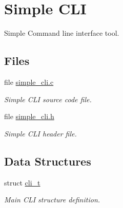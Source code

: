 \hypertarget{group___s_i_m_p_l_e___c_l_i}{\section{Simple C\+L\+I}
\label{group___s_i_m_p_l_e___c_l_i}
}


Simple Command line interface tool.  


\subsection*{Files}
\begin{DoxyCompactItemize}
\item 
file \hyperlink{simple__cli_8c}{simple\+\_\+cli.\+c}
\begin{DoxyCompactList}\small\item\em Simple C\+L\+I source code file. \end{DoxyCompactList}\item 
file \hyperlink{simple__cli_8h}{simple\+\_\+cli.\+h}
\begin{DoxyCompactList}\small\item\em Simple C\+L\+I header file. \end{DoxyCompactList}\end{DoxyCompactItemize}
\subsection*{Data Structures}
\begin{DoxyCompactItemize}
\item 
struct \hyperlink{structcli__t}{cli\+\_\+t}
\begin{DoxyCompactList}\small\item\em Main C\+L\+I structure definition. \end{DoxyCompactList}\end{DoxyCompactItemize}
